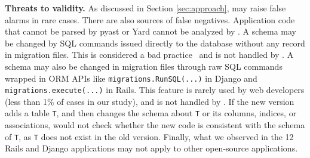 
\textbf{Threats to validity.}
As discussed in Section \ref{sec:approach}, 
\Tool may raise false alarms in rare cases.
There are also sources of false negatives.
Application code that cannot be parsed by pyast or Yard cannot be analyzed by 
\Tool. A schema may be changed by SQL commands issued directly to the database
without any record in migration files. This is considered a bad  practice~\cite{migration-guide} and is not handled by \Tool.
A schema may also be changed in migration files 
through raw SQL commands wrapped in ORM APIs like
\texttt{migrations.RunSQL(...)} in
Django and \texttt{migrations.execute(...)} in Rails. 
This feature is rarely used by web developers (less than 1\% of cases in our study), and is not handled by \Tool.
If the new version adds a table \texttt{T}, and then changes the schema about 
\texttt{T} or its columns, indices, or
associations, \Tool would not check whether the new code is consistent with the
schema of \texttt{T}, as \texttt{T} does not exist in the old version.
Finally, what we observed in the 12 Rails and Django applications may not apply to
other open-source applications.


